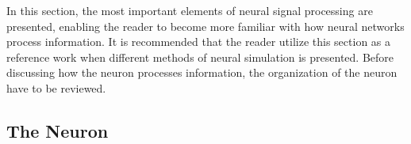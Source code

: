 	In this section, the most important elements of neural signal processing are presented, enabling the reader to become more familiar with how neural networks process information.
	It is recommended that the reader utilize this section as a reference work when different methods of neural simulation is presented.
	Before discussing how the neuron processes information, the organization of the neuron have to be reviewed. %




	



	


	
	\subsection{The Neuron}
	
